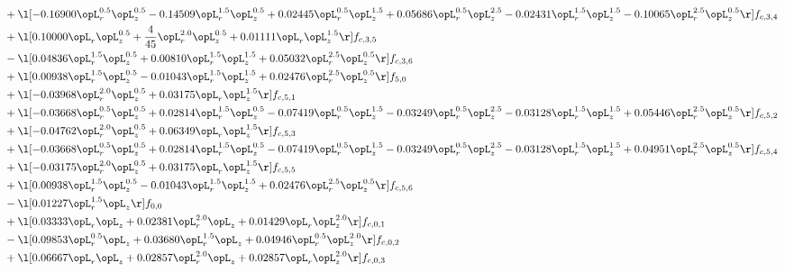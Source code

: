 \begin{alignat}{2}
& + \l[  -0.16900 \opL_r^{0.5} \opL_z^{0.5}   -0.14509 \opL_r^{1.5} \opL_z^{0.5} +  0.02445 \opL_r^{0.5} \opL_z^{1.5} +  0.05686 \opL_r^{0.5} \opL_z^{2.5}   -0.02431 \opL_r^{1.5} \opL_z^{1.5}   -0.10065 \opL_r^{2.5} \opL_z^{0.5}  \r] f_{c,3,4} \nonumber \\ 
& + \l[  0.10000 \opL_r \opL_z^{0.5} + \frac{4}{45} \opL_r^{2.0} \opL_z^{0.5} +  0.01111 \opL_r \opL_z^{1.5}  \r] f_{c,3,5} \nonumber \\ 
& - \l[  0.04836 \opL_r^{1.5} \opL_z^{0.5} +  0.00810 \opL_r^{1.5} \opL_z^{1.5} +  0.05032 \opL_r^{2.5} \opL_z^{0.5}  \r] f_{c,3,6} \nonumber \\ 
& + \l[  0.00938 \opL_r^{1.5} \opL_z^{0.5}   -0.01043 \opL_r^{1.5} \opL_z^{1.5} +  0.02476 \opL_r^{2.5} \opL_z^{0.5}  \r] f_{5,0} \nonumber \\ 
& + \l[  -0.03968 \opL_r^{2.0} \opL_z^{0.5} +  0.03175 \opL_r \opL_z^{1.5}  \r] f_{c,5,1} \nonumber \\ 
& + \l[  -0.03668 \opL_r^{0.5} \opL_z^{0.5} +  0.02814 \opL_r^{1.5} \opL_z^{0.5}   -0.07419 \opL_r^{0.5} \opL_z^{1.5}   -0.03249 \opL_r^{0.5} \opL_z^{2.5}   -0.03128 \opL_r^{1.5} \opL_z^{1.5} +  0.05446 \opL_r^{2.5} \opL_z^{0.5}  \r] f_{c,5,2} \nonumber \\ 
& + \l[  -0.04762 \opL_r^{2.0} \opL_z^{0.5} +  0.06349 \opL_r \opL_z^{1.5}  \r] f_{c,5,3} \nonumber \\ 
& + \l[  -0.03668 \opL_r^{0.5} \opL_z^{0.5} +  0.02814 \opL_r^{1.5} \opL_z^{0.5}   -0.07419 \opL_r^{0.5} \opL_z^{1.5}   -0.03249 \opL_r^{0.5} \opL_z^{2.5}   -0.03128 \opL_r^{1.5} \opL_z^{1.5} +  0.04951 \opL_r^{2.5} \opL_z^{0.5}  \r] f_{c,5,4} \nonumber \\ 
& + \l[  -0.03175 \opL_r^{2.0} \opL_z^{0.5} +  0.03175 \opL_r \opL_z^{1.5}  \r] f_{c,5,5} \nonumber \\ 
& + \l[  0.00938 \opL_r^{1.5} \opL_z^{0.5}   -0.01043 \opL_r^{1.5} \opL_z^{1.5} +  0.02476 \opL_r^{2.5} \opL_z^{0.5}  \r] f_{c,5,6} \nonumber \\ 
& - \l[  0.01227 \opL_r^{1.5} \opL_z  \r] f_{0,0} \nonumber \\ 
& + \l[  0.03333 \opL_r \opL_z +  0.02381 \opL_r^{2.0} \opL_z +  0.01429 \opL_r \opL_z^{2.0}  \r] f_{c,0,1} \nonumber \\ 
& - \l[  0.09853 \opL_r^{0.5} \opL_z +  0.03680 \opL_r^{1.5} \opL_z +  0.04946 \opL_r^{0.5} \opL_z^{2.0}  \r] f_{c,0,2} \nonumber \\ 
& + \l[  0.06667 \opL_r \opL_z +  0.02857 \opL_r^{2.0} \opL_z +  0.02857 \opL_r \opL_z^{2.0}  \r] f_{c,0,3} \nonumber \\ 

\end{alignat}
